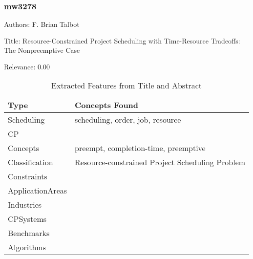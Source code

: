 \subsubsection{mw3278}
\label{mw:mw3278}

Authors: F. Brian Talbot

Title: Resource-Constrained Project Scheduling with Time-Resource Tradeoffs: The Nonpreemptive Case

Relevance:  0.00

{\scriptsize
\begin{longtable}{p{2cm}p{20cm}}
\caption{Extracted Features from Title and Abstract}\\ \toprule
Type & Concepts Found\\ \midrule
\endhead
\bottomrule
\endfoot
Scheduling & scheduling, order, job, resource\\ 
CP & \\ 
Concepts & preempt, completion-time, preemptive\\ 
Classification & Resource-constrained Project Scheduling Problem\\ 
Constraints & \\ 
ApplicationAreas & \\ 
Industries & \\ 
CPSystems & \\ 
Benchmarks & \\ 
Algorithms & \\ 
\end{longtable}
}

